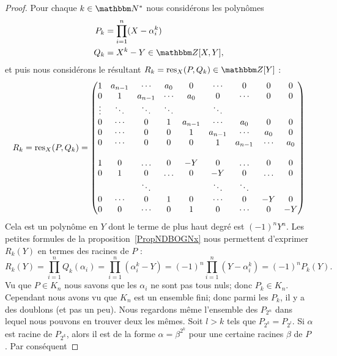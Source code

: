 \begin{proof}
    Pour chaque \( k\in \eN^*\) nous considérons les polynômes
    \begin{subequations}
        \begin{align}
            P_k&=\prod_{i=1}^n(X-\alpha_i^k)\\
            Q_k&=X^k-Y\in \eZ[X,Y],
        \end{align}
    \end{subequations}
    et puis nous considérons le résultant \( R_k=\res_X(P,Q_k)\in \eZ[Y]\) :
    \begin{equation}
        R_k=\operatorname{res}_X(P,Q_k)=
        \begin{pmatrix}
            1&a_{n-1}&\cdots&a_0&0&\cdots&0&0&0\\
            0&1&a_{n-1}&\cdots&a_0&0&\cdots&0&0\\
            \vdots&\ddots&\ddots&\ddots&&\ddots&\\
            0&\cdots&0&1&a_{n-1}&\cdots&a_0&0&0\\
            0&\cdots&0&0&1&a_{n-1}&\cdots&a_0&0\\
            0&\cdots&0&0&0&1&a_{n-1}&\cdots&a_0\\
        \\
                    1&0&\ldots&0&-Y&0&\ldots&0&0\\
                    0&1&0&\ldots&0&-Y&0&\ldots&0\\
                &&\ddots&&&\ddots&\ddots\\
                    0&\cdots&0&1&0&\cdots&0&-Y&0\\
                    0&0&\cdots&0&1&0&\cdots&0&-Y
        \end{pmatrix}
    \end{equation}
    Cela est un polynôme en \( Y\) dont le terme de plus haut degré est \( (-1)^nY^n\). Les petites formules de la proposition~\ref{PropNDBOGNx} nous permettent d'exprimer \( R_k(Y)\) en termes des racines de \( P\) :
    \begin{equation}
        R_k(Y)=\prod_{i=1}^nQ_k(\alpha_i)=\prod_{i=1}^n(\alpha_i^k-Y)=(-1)^n\prod_{i=1}^n(Y-\alpha_i^k)=(-1)^nP_k(Y).
    \end{equation}
    Vu que \( P\in K_n\) nous savons que les \( \alpha_i\) ne sont pas tous nuls; donc \( P_k\in K_n\). Cependant nous avons vu que \( K_n\) est un ensemble fini; donc parmi les \( P_k\), il y a des doublons (et pas un peu). Nous regardons même l'ensemble des \( P_{2^n}\) dans lequel nous pouvons en trouver deux les mêmes. Soit \( l>k\) tels que \( P_{2^k}=P_{2^l}\). Si \( \alpha\) est racine de \( P_{2^k}\), alors il est de la forme \( \alpha=\beta^{2^k}\) pour une certaine racines \( \beta\) de \( P\). Par conséquent

\end{proof}
